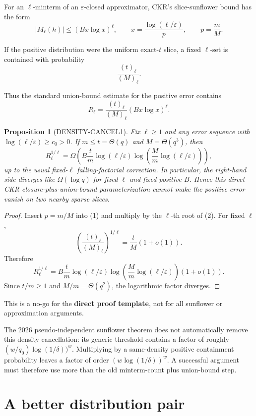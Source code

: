 \documentclass[11pt]{article}
\newtheorem{proposition}{Proposition}
\begin{document}
For an \(\ell\)-minterm of an \(\varepsilon\)-closed approximator, CKR's
slice-sunflower bound has the form
\[
|M_\ell(h)|
\le
\left(
B x\log x
\right)^\ell,
\qquad
x=
\frac{\log(\ell/\varepsilon)}{p},
\qquad
p=\frac mM.
\tag{1}
\]

If the positive distribution were the uniform exact-\(t\) slice, a fixed
\(\ell\)-set is contained with probability
\[
\frac{(t)_\ell}{(M)_\ell}.
\tag{2}
\]

Thus the standard union-bound estimate for the positive error contains
\[
R_\ell
=
\frac{(t)_\ell}{(M)_\ell}
\left(
B x\log x
\right)^\ell.
\tag{3}
\]

\begin{proposition}[DENSITY-CANCEL1]
Fix \(\ell\ge1\) and any error sequence with
\(\log(\ell/\varepsilon)\ge c_0>0\).
If \(m\le t=\Theta(q)\) and \(M=\Theta(q^3)\), then
\[
R_\ell^{1/\ell}
=
\Omega\left(
B\frac tm
\log(\ell/\varepsilon)
\log\left(
\frac{M}{m}\log(\ell/\varepsilon)
\right)
\right),
\tag{4}
\]
up to the usual fixed-\(\ell\) falling-factorial correction.  In particular,
the right-hand side diverges like \(\Omega(\log q)\) for fixed
\(\ell\) and fixed positive \(B\).  Hence this direct CKR
closure-plus-union-bound parameterization cannot make the positive error
vanish on two nearby sparse slices.
\end{proposition}

\begin{proof}
Insert \(p=m/M\) into (1) and multiply by the \(\ell\)-th root of
(2).  For fixed \(\ell\),
\[
\left(\frac{(t)_\ell}{(M)_\ell}\right)^{1/\ell}
=
\frac tM(1+o(1)).
\]
Therefore
\[
R_\ell^{1/\ell}
=
B\frac tm
\log(\ell/\varepsilon)
\log\left(
\frac{M}{m}\log(\ell/\varepsilon)
\right)
(1+o(1)).
\]
Since \(t/m\ge1\) and \(M/m=\Theta(q^2)\), the logarithmic factor
diverges.
\end{proof}

This is a no-go for the \textbf{direct proof template}, not for all
sunflower or approximation arguments.

The 2026 pseudo-independent sunflower theorem does not automatically remove
this density cancellation: its generic threshold contains a factor of roughly
\((w/q_0)\log(1/\delta))^w\).  Multiplying by a same-density positive
containment probability leaves a factor of order
\((w\log(1/\delta))^w\).  A successful argument must therefore use more than
the old minterm-count plus union-bound step.

\section{A better distribution pair}
\end{document}
